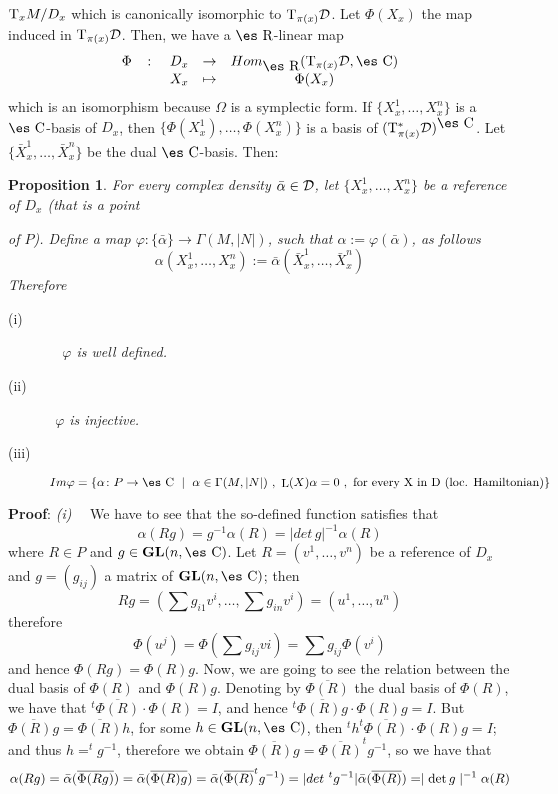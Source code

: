 \documentclass[12pt]{article}
\newtheorem{prop}{Proposition}
\def\GL{{\bf GL}(n,\Complex )}
\def\Real{\mbox{\es R}}
\def\Complex{\mbox{\es C}}
\def\Tan{{\rm T}}
\def\Lie{\mathop{\rm L}\nolimits}
\begin{document}
$\Tan_xM/D_x$ which is canonically isomorphic to $\Tan_{\pi (x)}{\cal
D}$.
Let $\Phi(X_x)$ the map induced in $\Tan_{\pi (x)}{\cal D}$.
Then, we have a $\Real$-linear map
$$
\begin{array}{ccccc}
\Phi & \colon & D_x & \to & Hom_{\Real}(\Tan_{\pi (x)}{\cal D},\Complex
)
\\
& & X_x & \mapsto & \Phi (X_x)
\end{array}
$$
which is an isomorphism because $\Omega$ is a symplectic form.
If $\{ X_x^1,\ldots ,X_x^n \}$ is a $\Complex$-basis of $D_x$, then
$\{ \Phi (X_x^1),\ldots ,\Phi (X_x^n) \}$ is a basis of
$(\Tan^*_{\pi (x)}{\cal D})^{\Complex}$.
 Let $\{ \bar X_x^1,\ldots ,\bar X_x^n \}$
be the dual $\Complex$-basis. Then:

\begin{prop}
For every complex density $\bar \alpha\in{\cal D}$,
let $\{ X_x^1,\ldots ,X_x^n \}$ be a reference of $D_x$ (that is a point

of $P$).
Define a map $\varphi\colon \{\bar\alpha\} \to \Gamma(M,| N |)$,
such that $\alpha :=\varphi (\bar \alpha)$, as follows
$$
\alpha (X_x^1,\ldots ,X_x^n) :=\bar \alpha (\bar X_x^1,\ldots ,\bar
X_x^n)
$$
Therefore
\begin{description}
\item[{\rm (i)}] \ \
$\varphi$ is well defined.
\item[{\rm (ii)}] \
$\varphi$ is injective.
\item[{\rm (iii)}]
$Im \varphi =\{ \alpha \colon P \to \Complex \ \mid \ \alpha \in
\Gamma(M,| N |) \ , \ \Lie(X)\alpha = 0 \ , \ \mbox{for every X in
D (loc. Hamiltonian)} \}$
\end{description}
\end{prop}
{\bf Proof}: 
{\it (i)} \ \
We have to see that the so-defined function satisfies that
$$
\alpha (Rg) = g^{-1} \alpha (R) =| det\, g |^{-1} \alpha (R)
$$
where $R \in P$ and $g \in \GL$. Let $R=(v^1,\ldots ,v^n)$ be
a reference of $D_x$ and $g=(g_{ij})$ a matrix of $\GL$; then
$$
Rg = (\sum g_{i1}v^i,\ldots ,\sum g_{in}v^i) = (u^1,\ldots ,u^n)
$$
therefore
$$
\Phi (u^j) = \Phi ( \sum g_{ij}vi) = \sum g_{ij} \Phi (v^i)
$$
and hence $\Phi (Rg) = \Phi (R) g$.
Now, we are going to see the relation between the dual basis of $\Phi
(R)$ and
$\Phi (R) g$. Denoting by $\overline {\Phi (R)}$
the dual basis of $\Phi(R)$, we have that $^t\overline {\Phi (R)} \cdot
\Phi (R) = I$, and hence
$^t\overline {\Phi (R) g} \cdot \Phi (R) g = I$.
But $\overline {\Phi (R) g} = \overline {\Phi (R)} h$,
for some $h \in \GL$, then $^th ^t\overline {\Phi (R)} \cdot \Phi (R) g
= I$;
and thus $h = ^tg^{-1}$, therefore we obtain
$\overline {\Phi (R) g} = \overline {\Phi (R)} ^tg^{-1}$, so we have
that
$$
\alpha (Rg)= \bar \alpha (\overline {\Phi (Rg)}) =
\bar \alpha (\overline {\Phi (R) g}) =
\bar \alpha (\overline {\Phi (R)}  ^tg^{-1}) =
| det \ ^tg^{-1} | \bar \alpha (\overline {\Phi (R)}) =
\mid {\rm det}\, g\mid^{-1} \alpha (R)
$$
\end{document}
